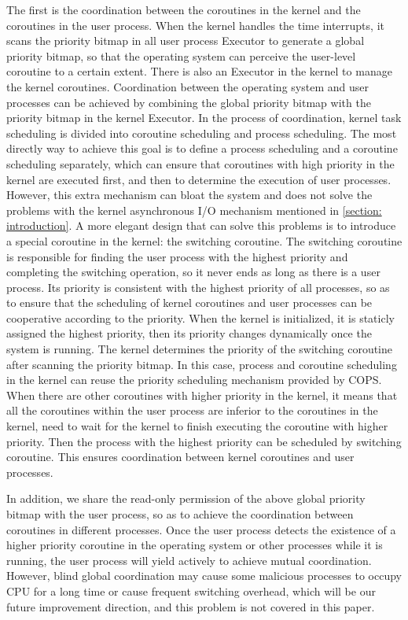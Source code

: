 \documentclass[sigconf,review,anonymous]{acmart}
\begin{document}
The first is the coordination between the coroutines in the kernel and the coroutines in the user process. When the kernel handles the time interrupts, it scans the priority bitmap in all user process Executor to generate a global priority bitmap, so that the operating system can perceive the user-level coroutine to a certain extent. There is also an Executor in the kernel to manage the kernel coroutines. Coordination between the operating system and user processes can be achieved by combining the global priority bitmap with the priority bitmap in the kernel Executor. In the process of coordination, kernel task scheduling is divided into coroutine scheduling and process scheduling. The most directly way to achieve this goal is to define a process scheduling and a coroutine scheduling separately, which can ensure that coroutines with high priority in the kernel are executed first, and then to determine the execution of user processes. However, this extra mechanism can bloat the system and does not solve the problems with the kernel asynchronous I/O mechanism mentioned in \ref{section: introduction}. A more elegant design that can solve this problems is to introduce a special coroutine in the kernel: the switching coroutine. The switching coroutine is responsible for finding the user process with the highest priority and completing the switching operation, so it never ends as long as there is a user process. Its priority is consistent with the highest priority of all processes, so as to ensure that the scheduling of kernel coroutines and user processes can be cooperative according to the priority. When the kernel is initialized, it is staticly assigned the highest priority, then its priority changes dynamically once the system is running. The kernel determines the priority of the switching coroutine after scanning the priority bitmap. In this case, process and coroutine scheduling in the kernel can reuse the priority scheduling mechanism provided by COPS. When there are other coroutines with higher priority in the kernel, it means that all the coroutines within the user process are inferior to the coroutines in the kernel, need to wait for the kernel to finish executing the coroutine with higher priority. Then the process with the highest priority can be scheduled by switching coroutine. This ensures coordination between kernel coroutines and user processes.

In addition, we share the read-only permission of the above global priority bitmap with the user process, so as to achieve the coordination between coroutines in different processes. Once the user process detects the existence of a higher priority coroutine in the operating system or other processes while it is running, the user process will yield actively to achieve mutual coordination. However, blind global coordination may cause some malicious processes to occupy CPU for a long time or cause frequent switching overhead, which will be our future improvement direction, and this problem is not covered in this paper.
\end{document}
